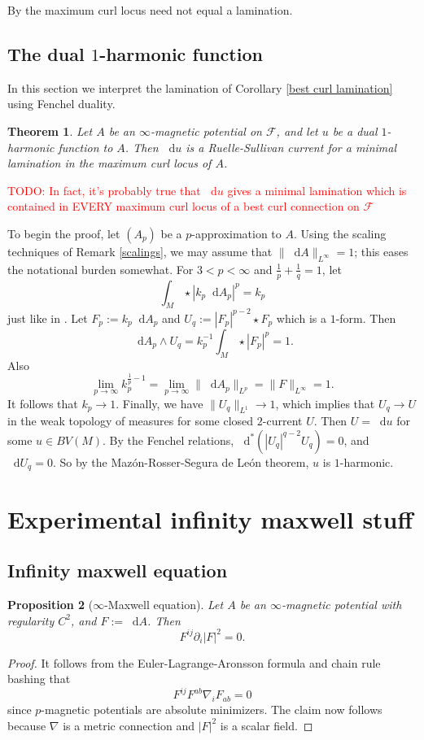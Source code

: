 \documentclass[reqno,11pt]{amsart}
\newcommand*\dif{\mathop{}\!\mathrm{d}}
\newtheorem{theorem}{Theorem}[section]
\newtheorem{proposition}[theorem]{Proposition}
\theoremstyle{definition}
\numberwithin{equation}{section}
\newcommand\todo[1]{\textcolor{red}{TODO: #1}}
\begin{document}
By \cite[Example 5.4]{bangert_cui_2017} the maximum curl locus need not equal a lamination.

\subsection{The dual $1$-harmonic function}
In this section we interpret the lamination of Corollary \ref{best curl lamination} using Fenchel duality.

\begin{theorem}
Let $A$ be an $\infty$-magnetic potential on $\mathscr F$, and let $u$ be a dual $1$-harmonic function to $A$.
Then $\dif u$ is a Ruelle-Sullivan current for a minimal lamination in the maximum curl locus of $A$.
\end{theorem}

\todo{In fact, it's probably true that $\dif u$ gives a minimal lamination which is contained in EVERY maximum curl locus of a best curl connection on $\mathscr F$}

To begin the proof, let $(A_p)$ be a $p$-approximation to $A$.
Using the scaling techniques of Remark \ref{scalings}, we may assume that $\|\dif A\|_{L^\infty} = 1$; this eases the notational burden somewhat.
For $3 < p < \infty$ and $\frac{1}{p} + \frac{1}{q} = 1$, let
$$\int_M \star |k_p \dif A_p|^p = k_p$$
just like in \cite[\S3.2]{daskalopoulos2020transverse}.
Let $F_p := k_p \dif A_p$ and $U_q := |F_p|^{p - 2} \star F_p$ which is a $1$-form.
Then 
$$\dif A_p \wedge U_q = k_p^{-1} \int_M \star |F_p|^p = 1.$$
Also 
$$\lim_{p \to \infty} k_p^{\frac{1}{p} - 1} = \lim_{p \to \infty} \|\dif A_p\|_{L^p} = \|F\|_{L^\infty} = 1.$$
It follows that $k_p \to 1$.
Finally, we have $\|U_q\|_{L^1} \to 1$, which implies that $U_q \to U$ in the weak topology of measures for some closed $2$-current $U$.
Then $U = \dif u$ for some $u \in BV(M)$.
By the Fenchel relations, $\dif^*(|U_q|^{q - 2} U_q) = 0$, and $\dif U_q = 0$.
So by the Maz\'on-Rosser-Segura de Le\'on theorem, $u$ is $1$-harmonic.

\appendix \section{Experimental infinity maxwell stuff}
\subsection{Infinity maxwell equation}

\begin{proposition}[$\infty$-Maxwell equation]
Let $A$ be an $\infty$-magnetic potential with regularity $C^2$, and $F := \dif A$. Then 
$$F^{ij} \partial_i |F|^2 = 0.$$
\end{proposition}
\begin{proof}
It follows from the Euler-Lagrange-Aronsson formula \cite[Theorem 5.2]{Barron2001} and chain rule bashing that
$$F^{ij} F^{ab} \nabla_i F_{ab} = 0$$
since $p$-magnetic potentials are absolute minimizers.
The claim now follows because $\nabla$ is a metric connection and $|F|^2$ is a scalar field.
\end{proof}
\end{document}

